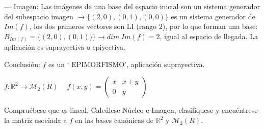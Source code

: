 \begin{proofw}
\noindent --- Imagen: Las imágenes de una base del espacio inicial son un sistema generador del subespacio imagen $\to \{(2,0),(0,1),(0,0)\}$ es un sistema generador de $Im(f)$, los dos primeros vectores son LI (rango $2$), por lo que forman una base: $B_{Im(f)}=\{(2,0),(0,1))\} \to dim\; Im(f)=2$, igual al espacio de llegada. La aplicación es suprayectiva o epiyectiva.

\noindent Conclusión: $f$ es un ` EPIMORFISMO', aplicación suprayectiva.
	
\end{proofw}


\begin{ejre}
	$f:\mathbb R^2 \to \mathcal M_2(R) \: \quad f(x,y)=\left( \begin{matrix} x&x+y\\0&y \end{matrix} \right)$
	
	Compruébese que es lineal, Calcúlese Núcleo e Imagen, clasifíquese y encuéntrese la matriz asociada a $f$ en las bases canónicas de $\mathbb R^2 \text{ y } \mathcal M_2(R)$.
\end{ejre}

